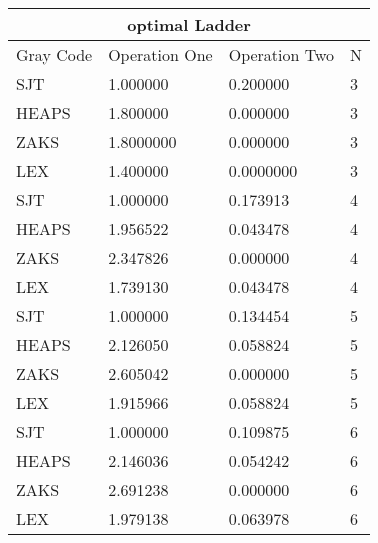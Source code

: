 \begin{tabular}{ |p{3cm}||p{3cm}|p{3cm}|p{3cm}|}
 \hline
 \multicolumn{4}{|c|}{optimal Ladder} \\
 \hline
 Gray Code& Operation One &Operation Two& N\\
 \hline
 SJT  & 1.000000 &0.200000 & 3\\
 HEAPS & 1.800000 & 0.000000 & 3 \\
 ZAKS & 1.8000000 & 0.000000 &  3\\
 LEX & 1.400000 & 0.0000000 &  3\\
 \hline

 SJT  & 1.000000 &0.173913 & 4\\
 HEAPS & 1.956522 & 0.043478 & 4 \\
 ZAKS & 2.347826 & 0.000000&  4\\
 LEX & 1.739130 & 0.043478 &  4\\
 \hline
 
 SJT  & 1.000000 &0.134454& 5\\
 HEAPS & 2.126050 & 0.058824 & 5 \\
 ZAKS & 2.605042 & 0.000000 &  5\\
 LEX & 1.915966 & 0.058824 &  5\\
 \hline
 
 SJT  & 1.000000 &0.109875 & 6\\
 HEAPS & 2.146036 & 0.054242 & 6\\
 ZAKS & 2.691238 & 0.000000 &  6\\
 LEX & 1.979138 & 0.063978&  6\\
 \hline
\end{tabular}
